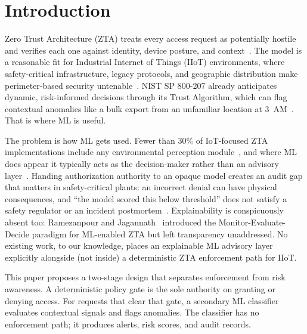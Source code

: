 \documentclass[conference]{IEEEtran}
\begin{document}
\section{Introduction}

Zero Trust Architecture (ZTA) treats every access request as potentially hostile and verifies each one against identity, device posture, and context~\cite{kindervag2010, nist800207}. The model is a reasonable fit for Industrial Internet of Things (IIoT) environments, where safety-critical infrastructure, legacy protocols, and geographic distribution make perimeter-based security untenable~\cite{zanasi2024, ehrlich2021}. NIST SP 800-207 already anticipates dynamic, risk-informed decisions through its Trust Algorithm, which can flag contextual anomalies like a bulk export from an unfamiliar location at 3~AM~\cite{nist800207}. That is where ML is useful.

The problem is how ML gets used. Fewer than 30\% of IoT-focused ZTA implementations include any environmental perception module~\cite{azad2024}, and where ML does appear it typically acts as the decision-maker rather than an advisory layer~\cite{laghari2025}. Handing authorization authority to an opaque model creates an audit gap that matters in safety-critical plants: an incorrect denial can have physical consequences, and ``the model scored this below threshold'' does not satisfy a safety regulator or an incident postmortem~\cite{capuano2022}. Explainability is conspicuously absent too: Ramezanpour and Jagannath~\cite{ramezanpour2022} introduced the Monitor-Evaluate-Decide paradigm for ML-enabled ZTA but left transparency unaddressed. No existing work, to our knowledge, places an explainable ML advisory layer explicitly alongside (not inside) a deterministic ZTA enforcement path for IIoT.

This paper proposes a two-stage design that separates enforcement from risk awareness. A deterministic policy gate is the sole authority on granting or denying access. For requests that clear that gate, a secondary ML classifier evaluates contextual signals and flags anomalies. The classifier has no enforcement path; it produces alerts, risk scores, and audit records.
\end{document}
